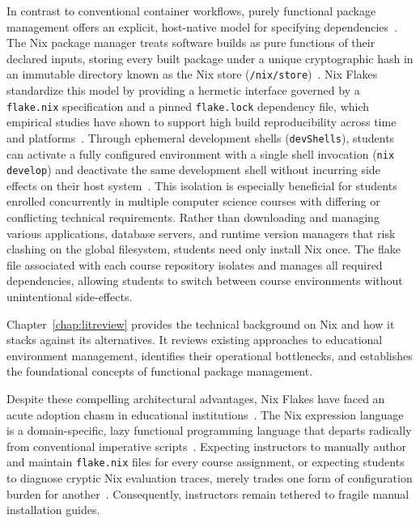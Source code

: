 In contrast to conventional container workflows, purely functional package management
offers an explicit, host-native model for specifying dependencies~\cite{dolstraPurelyFunctionalSystema,functionalSoftware}.
The Nix package manager treats software builds as pure functions of their declared
inputs, storing every built package under a unique cryptographic hash in an
immutable directory known as the Nix store (\texttt{/nix/store})~\cite{dolstraNixSafePolicyFree,dolstraNixOSPurelyFunctional2010}.
Nix Flakes standardize this model by providing a hermetic interface governed by
a \texttt{flake.nix} specification and a pinned \texttt{flake.lock} dependency
file, which empirical studies have shown to support high build reproducibility across
time and platforms~\cite{duNixRescueReproducible2026a,bandtAssessmentReproducibilityNix2025,malkaReproducibilityBuildEnvironments2024}.
Through ephemeral development shells (\texttt{devShells}), students can activate
a fully configured environment with a single shell invocation (\texttt{nix
develop}) and deactivate the same development shell without incurring side effects
on their host system~\cite{5BuildingReproducible,duNixRescueReproducible2026a}.
This isolation is especially beneficial for students enrolled concurrently in
multiple computer science courses with differing or conflicting technical
requirements. Rather than downloading and managing various applications,
database servers, and runtime version managers that risk clashing on the global filesystem,
students need only install Nix once. The flake file associated with each course repository
isolates and manages all required dependencies, allowing students to switch
between course environments without unintentional side-effects.

Chapter~\ref{chap:litreview} provides the technical background on Nix and how it
stacks against its alternatives. It reviews existing approaches to educational environment
management, identifies their operational bottlenecks, and establishes the foundational
concepts of functional package management.

Despite these compelling architectural advantages, Nix Flakes have faced an
acute adoption chasm in educational institutions~\cite{5BuildingReproducible,duNixRescueReproducible2026a}.
The Nix expression language is a domain-specific, lazy functional programming
language that departs radically from conventional imperative scripts~\cite{ModularityLazyEvaluation,duNixRescueReproducible2026a}.
Expecting instructors to manually author and maintain \texttt{flake.nix} files
for every course assignment, or expecting students to diagnose cryptic Nix evaluation
traces, merely trades one form of configuration burden for another~\cite{duNixRescueReproducible2026a,hauschImprovingReproducibilityScientific2025,OSCodeMy2024}.
Consequently, instructors remain tethered to fragile manual installation guides.

